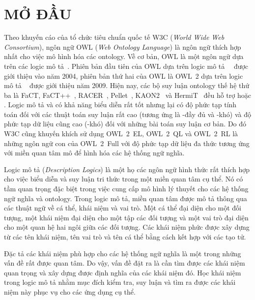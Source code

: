 \chapter*{MỞ ĐẦU}
\label{ChapterMoDau}
\thispagestyle{fancy}

Theo khuyến cáo của tổ chức tiêu chuẩn quốc tế W3C ({\em World Wide Web Consortium}), ngôn ngữ OWL ({\em Web Ontology Language}) là ngôn ngữ thích hợp nhất cho việc mô hình hóa các ontology. Về cơ bản, OWL là một ngôn ngữ dựa trên các logic mô tả~\cite{Horrocks2005,Horrocks2006,Horrocks2007}.
Phiên bản đầu tiên của OWL dựa trên logic mô tả~\SHOIQ~\cite{Horrocks2005,Horrocks2007} được giới thiệu vào năm 2004, phiên bản thứ hai của OWL là OWL~2 dựa trên logic mô tả \SROIQ~\cite{Horrocks2006} được giới thiệu năm 2009. Hiện nay, các bộ suy luận ontology thế hệ thứ ba là FaCT, FaCT++~\cite{Horrocks2003}, RACER~\cite{Haarslev2000}, Pellet~\cite{Sirin2004}, KAON2~\cite{Motik2006} và HermiT~\cite{Horrocks2012} đều hỗ trợ \SHOIQ hoặc \SROIQ. Logic mô tả \SHOIQ và \SROIQ có khả năng biểu diễn rất tốt nhưng lại có độ phức tạp tính toán đối với các thuật toán suy luận rất cao (tương ứng là \NEXPTIME-đầy đủ và \NEXPTIME-khó) và độ phức tạp dữ liệu cũng cao (\NP-khó) đối với những bài toán suy luận cơ bản. Do đó W3C cũng khuyến khích sử dụng OWL~2~EL, OWL~2~QL và OWL~2~RL là những ngôn ngữ con của OWL~2~Full với độ phức tạp dữ liệu đa thức tương ứng với miền quan tâm mô để hình hóa các hệ thống ngữ nghĩa.

Logic mô tả ({\em Description Logics}) là một họ các ngôn ngữ hình thức rất thích hợp cho việc biểu diễn và suy luận tri thức trong một miền quan tâm cụ thể. Nó có tầm quan trọng đặc biệt trong việc cung cấp mô hình lý thuyết cho các hệ thống ngữ nghĩa và ontology. Trong logic mô tả, miền quan tâm được mô tả thông qua các thuật ngữ về cá thể, khái niệm và vai trò. Một cá thể đại diện cho một đối tượng, một khái niệm đại diện cho một tập các đối tượng và một vai trò đại diện cho một quan hệ hai ngôi giữa các đối tượng. Các khái niệm phức được xây dựng từ các tên khái niệm, tên vai trò và tên cá thể bằng cách kết hợp với các tạo tử.

Đặc tả các khái niệm phù hợp cho các hệ thống ngữ nghĩa là một trong những vấn đề rất được quan tâm. Do vậy, vấn đề đặt ra là cần tìm được các khái niệm quan trọng và xây dựng được định nghĩa của các khái niệm đó. Học khái niệm trong logic mô tả nhằm mục đích kiểm tra, suy luận và tìm ra được các khái niệm này phục vụ cho các ứng dụng cụ thể.

